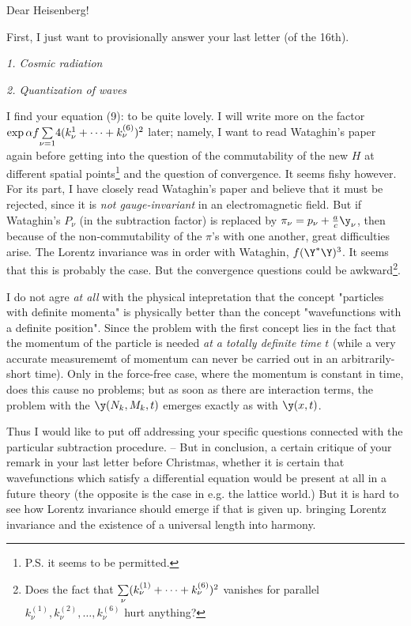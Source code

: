 \date{January 19, 1937}

Dear Heisenberg!

First, I just want to provisionally answer your last letter (of the 16th).

\textit{1. Cosmic radiation}


\textit{2. Quantization of waves}

I find your equation (9):
to be quite lovely. I will write more on the factor $\exp{\alpha f\underset{\nu=1}{\sum}{4}(k_\nu^1+\dots+k_\nu^{(6)})^2}$ later; namely, I want to read Wataghin's paper again before getting into the question of the commutability of the new $H$ at different spatial points\footnote{P.S. it seems to be permitted.} and the question of convergence. It seems fishy however. For its part, I have closely read Wataghin's paper and believe that it must be rejected, since it is \textit{not gauge-invariant} in an electromagnetic field. But if Wataghin's $P_\nu$ (in the subtraction factor) is replaced by $\pi_\nu = p_\nu + \frac{a}{c}\y_\nu$, then because of the non-commutability of the $\pi$'s with one another, great difficulties arise. The Lorentz invariance was in order with Wataghin,  $f(\Y^*\Y)^3$. It seems that this is probably the case. But the convergence questions could be awkward\footnote{Does the fact that $\underset{\nu}{\sum}(k_\nu^{(1)}+\dots+k_\nu^{(6)})^2$ vanishes for parallel $k_\nu^{(1)},k_\nu^{(2)},\dots,k_\nu^{(6)}$ hurt anything?}.

I do not agre \textit{at all} with the physical intepretation that the concept "particles with definite momenta" is physically better than the concept "wavefunctions with a definite position". Since the problem with the first concept lies in the fact that the momentum of the particle is needed \textit{at a totally definite time $t$} (while a very accurate measurememt of momentum can never be carried out in an arbitrarily-short time). Only in the force-free case, where the momentum is constant in time, does this cause no problems; but as soon as there are interaction terms, the problem with the $\y(N_k,M_k,t)$ emerges exactly as with $\y(x,t)$.

Thus I would like to put off addressing your specific questions connected with the particular subtraction procedure. -- But in conclusion, a certain critique of your remark in your last letter before Christmas, whether it is certain that wavefunctions which satisfy a differential equation would be present at all in a future theory (the opposite is the case in e.g. the lattice world.) But it is hard to see how Lorentz invariance should emerge if that is given up.  bringing Lorentz invariance and the existence of a universal length into harmony.

